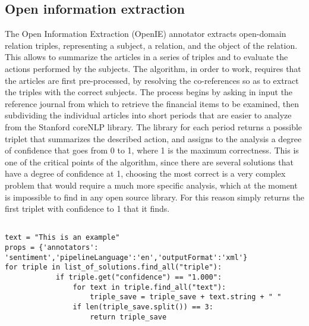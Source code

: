 \subsection{Open information extraction}
The Open Information Extraction (OpenIE) annotator extracts open-domain relation triples, representing a subject, a relation, and the object of the relation. This allows to summarize the articles in a series of triples and to evaluate the actions performed by the subjects. 
The algorithm, in order to work, requires that the articles are first pre-processed, by resolving the co-references so as to extract the triples with the correct subjects. 
The process begins by asking in input the reference journal from which to retrieve the financial items to be examined, then subdividing the individual articles into short periods that are easier to analyze from the Stanford coreNLP library. The library for each period returns a possible triplet that summarizes the described action, and assigns to the analysis a degree of confidence that goes from 0 to 1, where 1 is the maximum correctness. This is one of the critical points of the algorithm, since there are several solutions that have a degree of confidence at 1, choosing the most correct is a very complex problem that would require a much more specific analysis, which at the moment is impossible to find in any open source library. For this reason simply returns the first triplet with confidence to 1 that it finds.
\begin{verbatim}
               
text = "This is an example"
props = {'annotators': 'sentiment','pipelineLanguage':'en','outputFormat':'xml'}
for triple in list_of_solutions.find_all("triple"):
            if triple.get("confidence") == "1.000":
                for text in triple.find_all("text"):
                    triple_save = triple_save + text.string + " "
                if len(triple_save.split()) == 3:
                    return triple_save
\end{verbatim}

